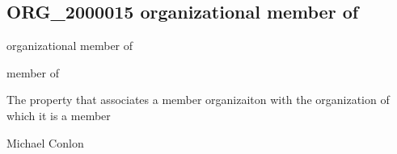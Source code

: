 \documentclass[letterpaper,10pt,english]{sphinxmanual}
\begin{document}
\subsection{ORG\_2000015 \sphinxhyphen{} organizational member of}
\label{\detokenize{doc-ORG_2000015:org-2000015-organizational-member-of}}\label{\detokenize{doc-ORG_2000015:index-0}}\label{\detokenize{doc-ORG_2000015::doc}}
\begin{sphinxShadowBox}

\sphinxAtStartPar
organizational member of
\end{sphinxShadowBox}

\begin{sphinxShadowBox}

\sphinxAtStartPar
member of
\end{sphinxShadowBox}

\begin{sphinxShadowBox}

\sphinxAtStartPar
{}
\end{sphinxShadowBox}

\begin{sphinxShadowBox}

\sphinxAtStartPar
The property that associates a member organizaiton with the organization of which it is a member
\end{sphinxShadowBox}

\begin{sphinxShadowBox}

\sphinxAtStartPar
Michael Conlon 
\end{sphinxShadowBox}

\begin{sphinxShadowBox}

\sphinxAtStartPar
{\hyperref[\detokenize{doc-ORG_0000001::doc}]{}}
\end{sphinxShadowBox}

\begin{sphinxShadowBox}

\sphinxAtStartPar
{\hyperref[\detokenize{doc-ORG_0000001::doc}]{}}
\end{sphinxShadowBox}
\end{document}
